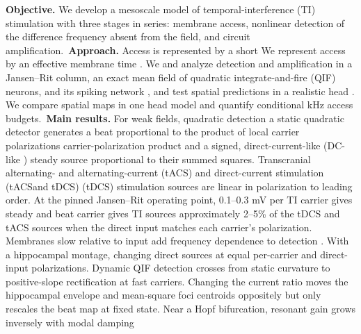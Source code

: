 \documentclass[11pt,a4paper]{article}
\newif\ifjne
\providecommand{\DIFaddtex}[1]{{\protect\color{blue} \sf #1}} %
\providecommand{\DIFdeltex}[1]{{\protect\color{red} \scriptsize #1}} %
\providecommand{\DIFaddbegin}{} %
\providecommand{\DIFaddend}{} %
\providecommand{\DIFdelbegin}{} %
\providecommand{\DIFdelend}{} %
\providecommand{\DIFadd}[1]{\texorpdfstring{\DIFaddtex{#1}}{#1}} %
\providecommand{\DIFdel}[1]{\texorpdfstring{\DIFdeltex{#1}}{}} %
\begin{document}
\noindent
\ifjne
\textbf{Objective.} We develop a mesoscale model of temporal-interference (TI) stimulation with three stages
in series: membrane access, nonlinear detection of the difference frequency absent from
the field, and circuit amplification.\
\textbf{Approach.} \DIFdelbegin \DIFdel{Access is represented by a short }\DIFdelend \DIFaddbegin \DIFadd{We represent access by an }\DIFaddend effective membrane time \DIFdelbegin \DIFdel{. We }\DIFdelend \DIFaddbegin \DIFadd{and }\DIFaddend analyze detection and
amplification in a Jansen--Rit column, an exact mean field of quadratic
integrate-and-fire \DIFaddbegin \DIFadd{(QIF) }\DIFaddend neurons, and its spiking network\DIFdelbegin \DIFdel{, and test spatial predictions in
a
realistic head }\DIFdelend \DIFaddbegin \DIFadd{. We compare spatial maps in
one head model and quantify conditional kHz access budgets}\DIFaddend .\
\textbf{Main results.} For weak fields, \DIFdelbegin \DIFdel{quadratic detection }\DIFdelend \DIFaddbegin \DIFadd{a static quadratic detector }\DIFaddend generates a beat proportional to the
\DIFdelbegin \DIFdel{product of
local carrier polarizations }\DIFdelend \DIFaddbegin \DIFadd{carrier-polarization product }\DIFaddend and a signed, \DIFaddbegin \DIFadd{direct-current-like (}\DIFaddend DC-like\DIFaddbegin \DIFadd{) }\DIFaddend steady source
proportional to their summed squares. Transcranial \DIFdelbegin \DIFdel{alternating- and }\DIFdelend \DIFaddbegin \DIFadd{alternating-current (tACS) and }\DIFaddend direct-current \DIFdelbegin \DIFdel{stimulation (tACSand tDCS)
}\DIFdelend \DIFaddbegin \DIFadd{(tDCS)
stimulation }\DIFaddend sources are linear \DIFdelbegin \DIFdel{in polarization }\DIFdelend to leading order. At the pinned
Jansen--Rit operating point, 0.1--0.3 mV per \DIFdelbegin \DIFdel{TI carrier gives steady and beat }\DIFdelend \DIFaddbegin \DIFadd{carrier gives TI }\DIFaddend sources approximately
2--5\% of \DIFdelbegin \DIFdel{the tDCS and tACS sources when the direct input matches each carrier's polarization. Membranes slow relative to input add frequency dependence to detection . With a
hippocampal montage, changing }\DIFdelend \DIFaddbegin \DIFadd{direct sources at equal per-carrier and direct-input
polarizations. Dynamic QIF detection crosses from static curvature to positive-slope
rectification at fast carriers. Changing }\DIFaddend the current ratio moves \DIFaddbegin \DIFadd{the hippocampal
}\DIFaddend envelope and mean-square \DIFdelbegin \DIFdel{foci
}\DIFdelend \DIFaddbegin \DIFadd{centroids }\DIFaddend oppositely but only rescales the beat map at
fixed state. Near a Hopf bifurcation, resonant gain grows inversely with modal damping
\end{document}
